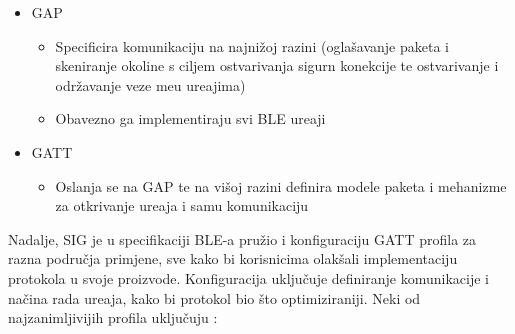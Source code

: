 \begin{itemize}
	\item GAP
	\begin{itemize}
		\item Specificira komunikaciju na najni\v{z}oj razini (ogla\v{s}avanje paketa i skeniranje okoline s ciljem ostvarivanja sigurn konekcije te ostvarivanje i odr\v{z}avanje veze me\dj u ure\dj ajima)
		\item Obavezno ga implementiraju svi BLE ure\dj aji
	\end{itemize}
	\item GATT
	\begin{itemize}
		\item Oslanja se na GAP te na vi\v{s}oj razini definira modele paketa i mehanizme za otkrivanje ure\dj aja i samu komunikaciju
	\end{itemize}
\end{itemize}

Nadalje, SIG je u specifikaciji BLE-a pru\v{z}io i konfiguraciju GATT profila za razna podru\v{c}ja primjene, sve kako bi korisnicima olak\v{s}ali implementaciju protokola u svoje proizvode. Konfiguracija uklju\v{c}uje definiranje komunikacije i na\v{c}ina rada ure\dj aja, kako bi protokol bio \v{s}to optimiziraniji. Neki od najzanimljivijih profila uklju\v{c}uju \cite{ble_profiles}: 


